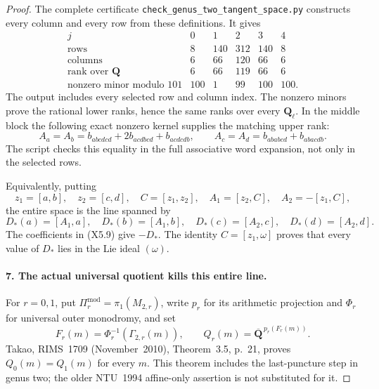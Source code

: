 \begin{proof}
The complete certificate
\texttt{check\_genus\_two\_tangent\_space.py} constructs
every column and every row from these definitions. It
gives
\[
\begin{array}{c|rrrrr}
 j&0&1&2&3&4\\\hline
 \text{rows}&8&140&312&140&8\\
 \text{columns}&6&66&120&66&6\\
 \text{rank over }\mathbf Q&6&66&119&66&6\\
 \text{nonzero minor modulo }101&100&1&99&100&100.
\end{array}
\tag{X5.8}
\]
The output includes every selected row and column index.
The nonzero minors prove the rational lower ranks, hence
the same ranks over every $\mathbf Q_\ell$. In the middle
block the following exact nonzero kernel supplies the
matching upper rank:
\[
 A_a=A_b=b_{abcdcd}+2b_{acdbcd}+b_{acdcdb},\qquad
 A_c=A_d=b_{ababcd}+b_{abacdb}.
 \tag{X5.9}
\]
The script checks this equality in the full associative
word expansion, not only in the selected rows.

Equivalently, putting
\[
 z_1=[a,b],\quad z_2=[c,d],\quad C=[z_1,z_2],
 \quad A_1=[z_2,C],\quad A_2=-[z_1,C],
\]
the entire space is the line spanned by
\[
 D_*(a)=[A_1,a],\quad D_*(b)=[A_1,b],\quad
 D_*(c)=[A_2,c],\quad D_*(d)=[A_2,d].
 \tag{X5.10}
\]
The coefficients in (X5.9) give $-D_*$. The identity
$C=[z_1,\omega]$ proves that every value of $D_*$ lies
in the Lie ideal $(\omega)$.

\paragraph{7. The actual universal quotient kills this entire line.}
For $r=0,1$, put
$\Pi_r^{\mathrm{mod}}=\pi_1(M_{2,r})$, write $p_r$ for
its arithmetic projection and $\Phi_r$ for universal outer
monodromy, and set
\[
 F_r(m)=\Phi_r^{-1}(\Gamma_{2,r}(m)),\qquad
 Q_r(m)=\overline{\mathbf Q}^{\,p_r(F_r(m))}.
\]
Takao, RIMS~1709 (November~2010), Theorem~3.5, p.~21,
proves $Q_0(m)=Q_1(m)$ for every $m$\cite{AuditTakao2010RIMS1709}. This theorem includes
the last-puncture step in genus two; the older NTU~1994
affine-only assertion is not substituted for it.


\end{proof}
